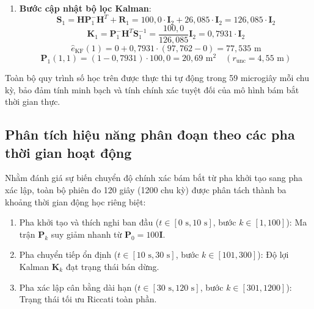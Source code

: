 \begin{enumerate}
    \item \textbf{Bước cập nhật bộ lọc Kalman}:
    \begin{equation}
    \mathbf{S}_1 = \mathbf{H} \mathbf{P}_1^- \mathbf{H}^T + \mathbf{R}_1 = 100{,}0 \cdot \mathbf{I}_2 + 26{,}085 \cdot \mathbf{I}_2 = 126{,}085 \cdot \mathbf{I}_2
    \end{equation}
    \begin{equation}
    \mathbf{K}_1 = \mathbf{P}_1^- \mathbf{H}^T \mathbf{S}_1^{-1} = \frac{100{,}0}{126{,}085} \mathbf{I}_2 = 0{,}7931 \cdot \mathbf{I}_2
    \end{equation}
    \begin{equation}
    \hat{e}_{\text{KF}}(1) = 0 + 0{,}7931 \cdot (97{,}762 - 0) = 77{,}535 \text{ m}
    \end{equation}
    \begin{equation}
    \mathbf{P}_1(1,1) = (1 - 0{,}7931) \cdot 100{,}0 = 20{,}69 \text{ m}^2 \quad (r_{\text{unc}} = 4{,}55\text{ m})
    \end{equation}
\end{enumerate}

Toàn bộ quy trình số học trên được thực thi tự động trong 59 microgiây mỗi chu kỳ, bảo đảm tính minh bạch và tính chính xác tuyệt đối của mô hình bám bắt thời gian thực.

\subsection{Phân tích hiệu năng phân đoạn theo các pha thời gian hoạt động}

\hspace{0.5cm} Nhằm đánh giá sự biến chuyển độ chính xác bám bắt từ pha khởi tạo sang pha xác lập, toàn bộ phiên đo 120 giây (1200 chu kỳ) được phân tách thành ba khoảng thời gian động học riêng biệt:
\begin{enumerate}
    \item Pha khởi tạo và thích nghi ban đầu ($t \in [0\text{ s}, 10\text{ s}]$, bước $k \in [1, 100]$): Ma trận $\mathbf{P}_k$ suy giảm nhanh từ $\mathbf{P}_0 = 100\mathbf{I}$.
    \item Pha chuyển tiếp ổn định ($t \in [10\text{ s}, 30\text{ s}]$, bước $k \in [101, 300]$): Độ lợi Kalman $\mathbf{K}_k$ đạt trạng thái bán dừng.
    \item Pha xác lập cân bằng dài hạn ($t \in [30\text{ s}, 120\text{ s}]$, bước $k \in [301, 1200]$): Trạng thái tối ưu Riccati toàn phần.
\end{enumerate}

